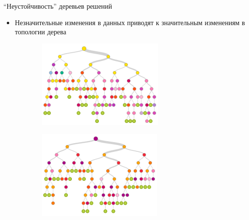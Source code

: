 \documentclass[10pt]{beamer}
\begin{document}
\begin{frame}{``Неустойчивость'' деревьев решений}
\begin{itemize}
    \item Незначительные изменения в данных приводят к значительным изменениям в
    топологии дерева
\end{itemize}
\begin{figure}
    \centering
    \begin{subfigure}[b]{0.45\textwidth}
        \includegraphics[width=\textwidth]{images/tree1.png}
    \end{subfigure}
    \begin{subfigure}[b]{0.45\textwidth}
        \includegraphics[width=\textwidth]{images/tree2.png}
    \end{subfigure}
\end{figure}
\end{frame}
\end{document}

